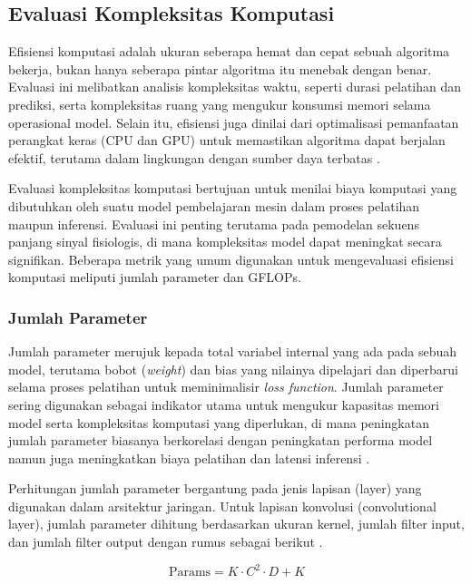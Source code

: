 \subsection{Evaluasi Kompleksitas Komputasi} \label{II.Teori1}
Efisiensi komputasi adalah ukuran seberapa hemat dan cepat sebuah algoritma bekerja, bukan hanya seberapa pintar algoritma itu menebak dengan benar. Evaluasi ini melibatkan analisis kompleksitas waktu, seperti durasi pelatihan dan prediksi, serta kompleksitas ruang yang mengukur konsumsi memori selama operasional model. Selain itu, efisiensi juga dinilai dari optimalisasi pemanfaatan perangkat keras (CPU dan GPU) untuk memastikan algoritma dapat berjalan efektif, terutama dalam lingkungan dengan sumber daya terbatas \cite{sivakumar2024simplified}.

Evaluasi kompleksitas komputasi bertujuan untuk menilai biaya komputasi yang dibutuhkan oleh suatu model pembelajaran mesin dalam proses pelatihan maupun inferensi. Evaluasi ini penting terutama pada pemodelan sekuens panjang sinyal fisiologis, di mana kompleksitas model dapat meningkat secara signifikan. Beberapa metrik yang umum digunakan untuk mengevaluasi efisiensi komputasi meliputi jumlah parameter dan GFLOPs.

\subsubsection{Jumlah Parameter}
Jumlah parameter merujuk kepada total variabel internal yang ada pada sebuah model, terutama bobot (\textit{weight}) dan bias yang nilainya dipelajari dan diperbarui selama proses pelatihan untuk meminimalisir \textit{loss function}. Jumlah parameter sering digunakan sebagai indikator utama untuk mengukur kapasitas memori model serta kompleksitas komputasi yang diperlukan, di mana peningkatan jumlah parameter biasanya berkorelasi dengan peningkatan performa model namun juga meningkatkan biaya pelatihan dan latensi inferensi \cite{10.1145/3578938}.

Perhitungan jumlah parameter bergantung pada jenis lapisan (layer) yang digunakan dalam arsitektur jaringan. Untuk lapisan konvolusi (convolutional layer), jumlah parameter dihitung berdasarkan ukuran kernel, jumlah filter input, dan jumlah filter output dengan rumus sebagai berikut \cite{DBLP:journals/corr/abs-2103-05251}. 

\begin{equation}
    \text{Params} = K \cdot C^2 \cdot D + K
\end{equation}
\vspace{1em}

